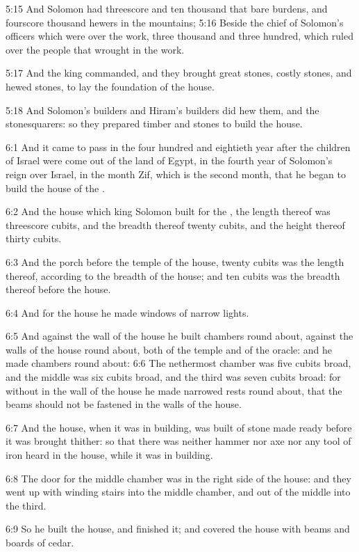 5:15 And Solomon had threescore and ten thousand that bare burdens,
and fourscore thousand hewers in the mountains; 5:16 Beside the chief
of Solomon's officers which were over the work, three thousand and
three hundred, which ruled over the people that wrought in the work.

5:17 And the king commanded, and they brought great stones, costly
stones, and hewed stones, to lay the foundation of the house.

5:18 And Solomon's builders and Hiram's builders did hew them, and the
stonesquarers: so they prepared timber and stones to build the house.

6:1 And it came to pass in the four hundred and eightieth year after
the children of Israel were come out of the land of Egypt, in the
fourth year of Solomon's reign over Israel, in the month Zif, which is
the second month, that he began to build the house of the \LORD.

6:2 And the house which king Solomon built for the \LORD, the length
thereof was threescore cubits, and the breadth thereof twenty cubits,
and the height thereof thirty cubits.

6:3 And the porch before the temple of the house, twenty cubits was
the length thereof, according to the breadth of the house; and ten
cubits was the breadth thereof before the house.

6:4 And for the house he made windows of narrow lights.

6:5 And against the wall of the house he built chambers round about,
against the walls of the house round about, both of the temple and of
the oracle: and he made chambers round about: 6:6 The nethermost
chamber was five cubits broad, and the middle was six cubits broad,
and the third was seven cubits broad: for without in the wall of the
house he made narrowed rests round about, that the beams should not be
fastened in the walls of the house.

6:7 And the house, when it was in building, was built of stone made
ready before it was brought thither: so that there was neither hammer
nor axe nor any tool of iron heard in the house, while it was in
building.

6:8 The door for the middle chamber was in the right side of the
house: and they went up with winding stairs into the middle chamber,
and out of the middle into the third.

6:9 So he built the house, and finished it; and covered the house with
beams and boards of cedar.


